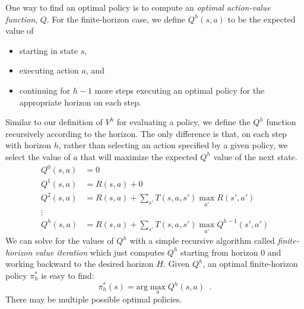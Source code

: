 One way to find an optimal policy is to compute an {\em  optimal
  action-value function}, $Q$.  For the finite-horizon case, we define 
$Q^h(s, a)$ to be the expected value of 
\begin{itemize}
\item starting in state $s$,
\item executing action $a$, and
\item continuing for $h - 1$ more steps executing an optimal policy
  for the appropriate horizon on each step.
\end{itemize}
Similar to our definition of $V^h$ for evaluating a policy, we define
the $Q^h$ function recursively according to the horizon.  The only
difference is that, on each step with horizon $h$, rather than
selecting an action specified by a given  policy, we select the value
of $a$ that will maximize the expected $Q^h$ value of the next state.
\begin{align}
Q^0(s, a) &= 0\\
Q^1(s, a) &= R(s, a) + 0\\
Q^2(s, a) &= R(s, a) + \sum_{s'}T(s, a, s') \max_{a'} R(s', a')\\
\vdots
\nonumber \\
Q^h(s, a) &= R(s, a) + \sum_{s'}T(s, a, s') \max_{a'} Q^{h - 1}(s', a')
\end{align}
We can solve for the values of $Q^h$ with a simple recursive algorithm
called {\it{finite-horizon value iteration}} which just computes $Q^h$ starting
from horizon 0 and working backward to the desired horizon
$H$. Given $Q^h$, an optimal finite-horizon policy $\pi_h^*$ is easy to find: 
\begin{equation}
 \pi_h^*(s) = \text{arg}\max_{a}Q^h(s, a) \;\;.
\end{equation}
There may be multiple possible optimal policies.

